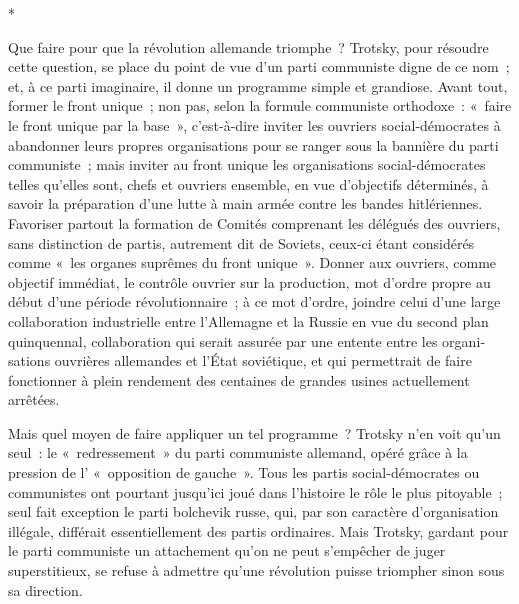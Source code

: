 \documentclass[french,twoside]{book} %
\begin{document}
\begin{center}
\noindent \centerline{*}\par
\end{center}

\noindent \par
Que faire pour que la révolution allemande triomphe ? Trotsky, pour résoudre cette question, se place du point de vue d'un parti communiste digne de ce nom ; et, à ce parti imaginaire, il donne un programme simple et gran­diose. Avant tout, former le front unique ; non pas, selon la formule communiste orthodoxe : « faire le front unique par la base », c'est-à-dire inviter les ouvriers social-démocrates à abandonner leurs propres organisa­tions pour se ranger sous la bannière du parti communiste ; mais inviter au front unique les organisations social-démocrates telles qu'elles sont, chefs et ouvriers ensemble, en vue d'objectifs déterminés, à savoir la préparation d'une lutte à main armée contre les bandes hitlériennes. Favoriser partout la forma­tion de Comités comprenant les délégués des ouvriers, sans distinction de partis, autrement dit de Soviets, ceux-ci étant considérés comme « les organes suprêmes du front unique ». Donner aux ouvriers, comme objectif immédiat, le contrôle ouvrier sur la production, mot d'ordre propre au début d'une période révolutionnaire ; à ce mot d'ordre, joindre celui d'une large collabo­ration industrielle entre l'Allemagne et la Russie en vue du second plan quinquennal, collaboration qui serait assurée par une entente entre les organi­sations ouvrières allemandes et l'État soviétique, et qui permettrait de faire fonctionner à plein rendement des centaines de grandes usines actuellement arrêtées.\par
Mais quel moyen de faire appliquer un tel programme ? Trotsky n'en voit qu'un seul : le « redressement » du parti communiste allemand, opéré grâce à la pression de l' « opposition de gauche ». Tous les partis social-démocrates ou communistes ont pourtant jusqu'ici joué dans l'histoire le rôle le plus pitoyable ; seul fait exception le parti bolchevik russe, qui, par son caractère d'organisation illégale, différait essentiellement des partis ordinaires. Mais Trotsky, gardant pour le parti communiste un attachement qu'on ne peut s'em­pêcher de juger superstitieux, se refuse à admettre qu'une révolution puisse triompher sinon sous sa direction.\par
\end{document}
